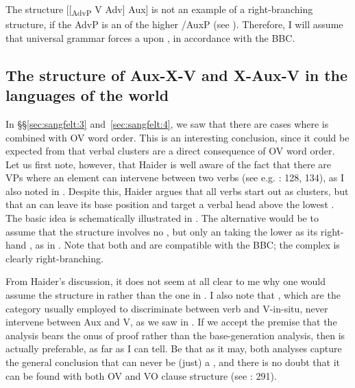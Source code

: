 \documentclass[output=paper, colorlinks, citecolor=brown]{langscibook}
\begin{document}
The structure [[\textsubscript{AdvP} V Adv] Aux] is not an example of a right-branching structure, if the AdvP is an  of the higher /AuxP (see \citealt{Haider2013}). Therefore, I will assume that universal grammar forces a  upon , in accordance with the BBC. 


\subsection{The structure of Aux-X-V and X-Aux-V in the languages of the world}\label{sec:sangfelt:5.2}

In §§\ref{sec:sangfelt:3} and~\ref{sec:sangfelt:4}, we saw that there are cases where  is combined with OV word order. This is an interesting conclusion, since it could be expected from \citet{Haider2010} that verbal clusters are a direct consequence of OV word order. Let us first note, however, that Haider is well aware of the fact that there are  VPs where an element can intervene between two verbs (see e.g. \citealt{Haider2013}: 128, 134), as I also noted in . Despite this, Haider argues that all verbs start out as clusters, but that an  can leave its base position and target a verbal head above the lowest  \parencites[290–291]{Haider2010}[134]{Haider2013}. The basic idea is schematically illustrated in . The alternative would be to assume that the structure involves no , but only an  taking the lower  as its right-hand , as in . Note that both  and  are compatible with the BBC; the complex  is clearly right-branching.

\settowidth{}
\ea
\label{ex:sangfelt:30}
 
 
\z 
\z

From Haider’s discussion, it does not seem at all clear to me why one would assume the structure in  rather than the one in . I also note that , which are the category usually employed to discriminate between verb  and V-in-situ, never intervene between Aux and V, as we saw in . If we accept the premise that the  analysis bears the onus of proof rather than the base-generation analysis, then  is actually preferable, as far as I can tell. Be that as it may, both analyses capture the general conclusion that  can never be (just) a , and there is no doubt that it can be found with both OV and VO clause structure (see \citealt{Haider2010}: 291).
\end{document}
